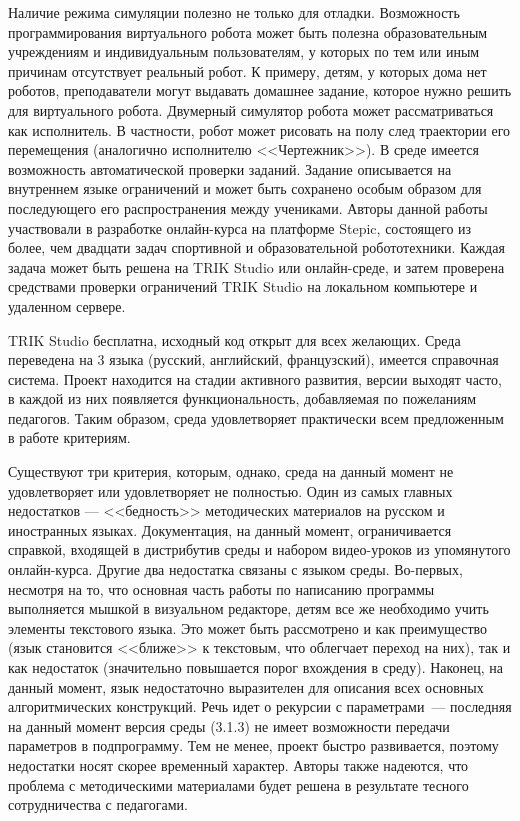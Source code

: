 \documentclass[a5paper]{article}
\begin{document}
Наличие режима симуляции полезно не только для отладки. Возможность программирования виртуального робота может 
быть полезна образовательным учреждениям и индивидуальным пользователям, у которых по тем или иным причинам 
отсутствует реальный робот. К примеру, детям, у которых дома нет роботов, преподаватели могут выдавать домашнее 
задание, которое нужно решить для виртуального робота. Двумерный симулятор робота может рассматриваться как 
исполнитель. В частности, робот может рисовать на полу след траектории его перемещения (аналогично исполнителю 
<<Чертежник>>). В среде имеется возможность автоматической проверки заданий. Задание описывается на внутреннем 
языке ограничений и может быть сохранено особым образом для последующего его распространения между учениками. 
Авторы данной работы участвовали в разработке онлайн-курса на платформе Stepic, состоящего из более, чем двадцати 
задач спортивной и образовательной робототехники. Каждая задача может быть решена на TRIK Studio или онлайн-среде, 
и затем проверена средствами проверки ограничений TRIK Studio на локальном компьютере и удаленном сервере.

TRIK Studio бесплатна, исходный код открыт для всех желающих. Среда переведена на 3 языка (русский, английский, 
французский), имеется справочная система. Проект находится на стадии активного развития, версии выходят часто, 
в каждой из них появляется функциональность, добавляемая по пожеланиям педагогов. Таким образом, среда 
удовлетворяет практически всем предложенным в работе критериям. 

Существуют три критерия, которым, однако, среда на данный момент не удовлетворяет или удовлетворяет не полностью. 
Один из самых главных недостатков --- <<бедность>> методических материалов на русском и иностранных языках. 
Документация, на данный момент, ограничивается справкой, входящей в дистрибутив среды и набором видео-уроков 
из упомянутого онлайн-курса. Другие два недостатка связаны с языком среды. Во-первых, несмотря на то, 
что основная часть работы по написанию программы выполняется мышкой в визуальном редакторе, детям все же 
необходимо учить элементы текстового языка. Это может быть рассмотрено и как преимущество (язык становится 
<<ближе>> к текстовым, что облегчает переход на них), так и как недостаток (значительно повышается порог 
вхождения в среду). Наконец, на данный момент, язык недостаточно выразителен для описания всех основных 
алгоритмических конструкций. Речь идет о рекурсии с параметрами~--- последняя на данный момент версия среды 
(3.1.3) не имеет возможности передачи параметров в подпрограмму. Тем не менее, проект быстро развивается, 
поэтому недостатки носят скорее временный характер. Авторы также надеются, что проблема с методическими 
материалами будет решена в результате тесного сотрудничества с педагогами.
\end{document}
